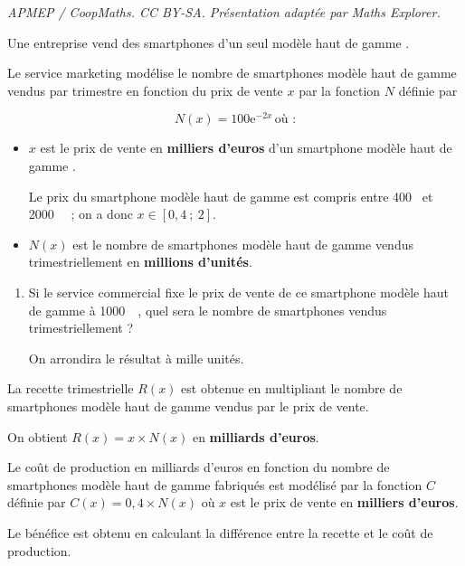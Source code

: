 \documentclass[10pt]{article}
\providecommand{\euro}{\texteuro}
\providecommand{\e}{{\mathrm{e}}}
\providecommand{\np}[2][]{{#2~#1}}
\providecommand{\euro}{{\text{€}}}
\renewcommand{\euro}{\ifmmode\text{\texteuro}\else\texteuro\fi}
\begin{document}
\noindent\textit{APMEP / CoopMaths. CC BY-SA. Présentation adaptée par Maths Explorer.}\par\medskip
\medskip

Une entreprise vend des smartphones d'un seul modèle \og haut de gamme \fg.

Le service marketing modélise le nombre de smartphones modèle \og haut de gamme\fg{}
vendus par trimestre en fonction du prix de vente $x$ par la fonction $N$ définie par 

\[N(x) = 100\e^{-2x}\,  \text{où :}\]


\setlength\parindent{1cm}
\begin{itemize}
\item $x$ est le prix de vente en \textbf{milliers d'euros} d'un smartphone modèle \og haut de gamme \fg.

 Le prix du smartphone modèle \og haut de gamme\fg{} est compris entre 400~\euro{} et \np{2000}~\euro{} ; on a donc $x \in [0,4~;~2]$.
\item $N(x)$ est le nombre de smartphones modèle \og haut de gamme\fg{} vendus trimestriellement en \textbf{millions d'unités}.
\end{itemize}
\setlength\parindent{0cm}

\smallskip

\begin{enumerate}
\item Si le service commercial fixe le prix de vente de ce smartphone modèle \og haut de gamme\fg{} à \np{1000}~\euro, quel sera le nombre de smartphones vendus trimestriellement ? 

On arrondira le résultat à mille unités.
\end{enumerate}

La recette trimestrielle $R(x)$ est obtenue en multipliant le nombre de smartphones modèle \og haut de gamme\fg{} vendus par le prix de vente. 

On obtient $R(x) = x \times  N(x)$ en \textbf{milliards d'euros}.

Le coût de production en milliards d'euros en fonction du nombre de smartphones modèle \og haut de gamme\fg{} fabriqués est modélisé par la fonction $C$ définie par $C(x) = 0,4 \times N(x)$ où $x$ est le prix de vente en \textbf{milliers d'euros}.

Le bénéfice est obtenu en calculant la différence entre la recette et le coût de production.

\smallskip
\end{document}

